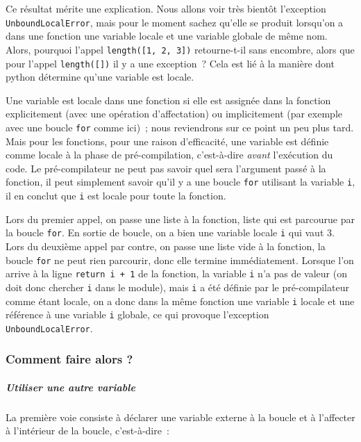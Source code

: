     Ce résultat mérite une explication. Nous allons voir très bientôt
l'exception \texttt{UnboundLocalError}, mais pour le moment sachez
qu'elle se produit lorsqu'on a dans une fonction une variable locale et
une variable globale de même nom. Alors, pourquoi l'appel
\texttt{length({[}1,\ 2,\ 3{]})} retourne-t-il sans encombre, alors que
pour l'appel \texttt{length({[}{]})} il y a une exception~? Cela est lié
à la manière dont python détermine qu'une variable est locale.

Une variable est locale dans une fonction si elle est assignée dans la
fonction explicitement (avec une opération d'affectation) ou
implicitement (par exemple avec une boucle \texttt{for} comme ici)~;
nous reviendrons sur ce point un peu plus tard. Mais pour les fonctions,
pour une raison d'efficacité, une variable est définie comme locale à la
phase de pré-compilation, c'est-à-dire \emph{avant} l'exécution du code.
Le pré-compilateur ne peut pas savoir quel sera l'argument passé à la
fonction, il peut simplement savoir qu'il y a une boucle \texttt{for}
utilisant la variable \texttt{i}, il en conclut que \texttt{i} est
locale pour toute la fonction.

Lors du premier appel, on passe une liste à la fonction, liste qui est
parcourue par la boucle \texttt{for}. En sortie de boucle, on a bien une
variable locale \texttt{i} qui vaut 3. Lors du deuxième appel par
contre, on passe une liste vide à la fonction, la boucle \texttt{for} ne
peut rien parcourir, donc elle termine immédiatement. Lorsque l'on
arrive à la ligne \texttt{return\ i\ +\ 1} de la fonction, la variable
\texttt{i} n'a pas de valeur (on doit donc chercher \texttt{i} dans le
module), mais \texttt{i} a été définie par le pré-compilateur comme
étant locale, on a donc dans la même fonction une variable \texttt{i}
locale et une référence à une variable \texttt{i} globale, ce qui
provoque l'exception \texttt{UnboundLocalError}.

    \hypertarget{comment-faire-alors}{%
\subsubsection{Comment faire alors ?}\label{comment-faire-alors}}

    \hypertarget{utiliser-une-autre-variable}{%
\subparagraph{Utiliser une autre
variable}\label{utiliser-une-autre-variable}}

    La première voie consiste à déclarer une variable externe à la boucle et
à l'affecter à l'intérieur de la boucle, c'est-à-dire~:

